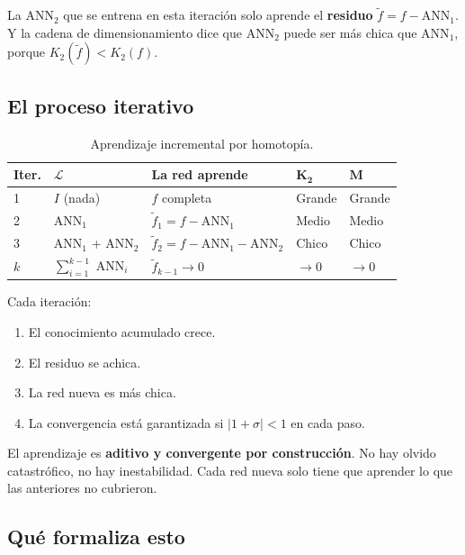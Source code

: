 \documentclass[11pt,a4paper]{article}
\begin{document}
La ANN$_2$ que se entrena en esta iteraci\'on solo aprende el \textbf{residuo} $\tilde{f} = f - \text{ANN}_1$. Y la cadena de dimensionamiento dice que ANN$_2$ puede ser m\'as chica que ANN$_1$, porque $K_2(\tilde{f}) < K_2(f)$.

\subsection{El proceso iterativo}

\begin{table}[H]
\centering
\caption{Aprendizaje incremental por homotop\'ia.}
\begin{tabular}{C{1.5cm} L{3cm} L{3.5cm} C{1.5cm} C{1.5cm}}
\toprule
\textbf{Iter.} & $\boldsymbol{\mathcal{L}}$ & \textbf{La red aprende} & $\boldsymbol{K_2}$ & $\boldsymbol{M}$ \\
 & $I$ (nada) & $f$ completa & Grande & Grande \\
2 & ANN$_1$ & $\tilde{f}_1 = f - \text{ANN}_1$ & Medio & Medio \\
3 & ANN$_1$ + ANN$_2$ & $\tilde{f}_2 = f - \text{ANN}_1 - \text{ANN}_2$ & Chico & Chico \\
$k$ & $\sum_{i=1}^{k-1}$ ANN$_i$ & $\tilde{f}_{k-1} \to 0$ & $\to 0$ & $\to 0$ \\
\bottomrule
\end{tabular}
\end{table}

Cada iteraci\'on:
\begin{enumerate}[nosep]
\item El conocimiento acumulado crece.
\item El residuo se achica.
\item La red nueva es m\'as chica.
\item La convergencia est\'a garantizada si $|1+\sigma| < 1$ en cada paso.
\end{enumerate}

\begin{clave}
El aprendizaje es \textbf{aditivo y convergente por construcci\'on}. No hay olvido catastr\'ofico, no hay inestabilidad. Cada red nueva solo tiene que aprender lo que las anteriores no cubrieron.
\end{clave}

\subsection{Qu\'e formaliza esto}
\end{document}
